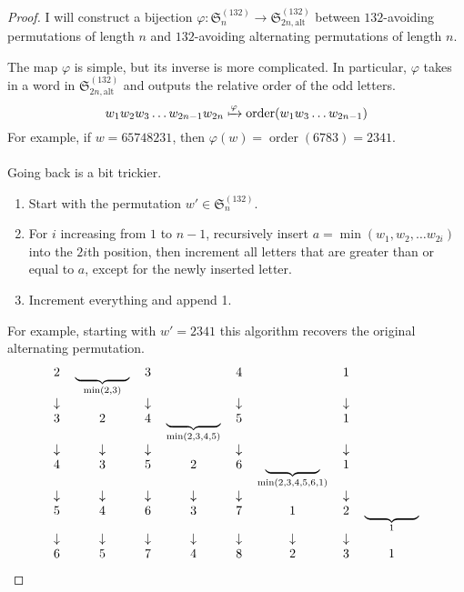 \documentclass{article}
\begin{document}
\begin{proof}
  I will construct a bijection
  $\varphi\colon \mathfrak S_{n}^{(132)} \rightarrow \mathfrak S_{2n,\text{alt}}^{(132)}$
  between $132$-avoiding permutations of length $n$ and
  $132$-avoiding alternating permutations of length $n$.

  The map $\varphi$ is simple, but its inverse is more complicated. In
  particular, $\varphi$ takes in a word in $\mathfrak S_{2n,\text{alt}}^{(132)}$
  and outputs the relative order of the odd letters.
  \[
    w_1 w_2 w_3 \hdots w_{2n-1} w_{2n} \xmapsto{\varphi}
    \operatorname{order}(w_1 w_3 \hdots w_{2n-1})
  \]
  For example, if $w = 65748231$, then
  $\varphi(w) = \operatorname{order}(6783) = 2341$.
  \\~\\
  Going back is a bit trickier.
  \begin{enumerate}
    \item Start with the permutation $w' \in \mathfrak S_{n}^{(132)}$.
    \item For $i$ increasing from $1$ to $n-1$, recursively insert
      $a = \min(w_1, w_2, \hdots w_{2i})$ into the $2i$th position, then
      increment all letters that are greater than or equal to $a$, except
      for the newly inserted letter.
    \item Increment everything and append 1.
  \end{enumerate}
  For example, starting with $w' = 2341$ this algorithm recovers the original
  alternating permutation. \begin{align*}
    \begin{tabular}{ c c c c c c c c }
    $2$ & $\underbrace{\hspace{1.5cm}}_{\min(2, 3)}$  & $3$ &  & $4$ & & $1$ & \\
    $\downarrow$ & & $\downarrow$ &  & $\downarrow$ & & $\downarrow$ & \\
    $3$ & $2$ & $4$ & $\underbrace{\hspace{1.5cm}}_{\min(2, 3, 4, 5)}$ & $5$ & & $1$ & \\
    $\downarrow$ & $\downarrow$ & $\downarrow$ & & $\downarrow$ & & $\downarrow$ & \\
    $4$ & $3$ & $5$ & $2$ & $6$ & $\underbrace{\hspace{1.5cm}}_{\min(2, 3, 4, 5, 6, 1)}$ & $1$ & \\
    $\downarrow$ & $\downarrow$ & $\downarrow$ & $\downarrow$ & $\downarrow$ & & $\downarrow$ & \\
    $5$ & $4$ & $6$ & $3$ & $7$ & $1$ & $2$ & $\underbrace{\hspace{1.5cm}}_{1}$ \\
    $\downarrow$ & $\downarrow$ & $\downarrow$ & $\downarrow$ & $\downarrow$ & $\downarrow$ & $\downarrow$ & \\
    $6$ & $5$ & $7$ & $4$ & $8$ & $2$ & $3$ & 1
    \end{tabular}
  \end{align*}


\end{proof}
\end{document}
